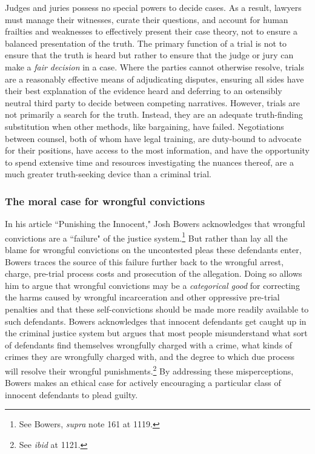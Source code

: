 Judges and juries possess no special powers to decide cases. As a result, lawyers must manage their witnesses, curate their questions, and account for human frailties and weaknesses to effectively present their case theory, not to ensure a balanced presentation of the truth. The primary function of a trial is not to ensure that the truth is heard but rather to ensure that the judge or jury can make a \textit{fair decision} in a case. Where the parties cannot otherwise resolve, trials are a reasonably effective means of adjudicating disputes, ensuring all sides have their best explanation of the evidence heard and deferring to an ostensibly neutral third party to decide between competing narratives. However, trials are not primarily a search for the truth. Instead, they are an adequate truth-finding substitution when other methods, like bargaining, have failed. Negotiations between counsel, both of whom have legal training, are duty-bound to advocate for their positions, have access to the most information, and have the opportunity to spend extensive time and resources investigating the nuances thereof, are a much greater truth-seeking device than a criminal trial.

\subsubsection{The moral case for wrongful convictions}

In his article ``Punishing the Innocent," Josh Bowers acknowledges that wrongful convictions are a ``failure" of the justice system.\footnote{See Bowers, \textit{supra} note 161 at 1119.} But rather than lay all the blame for wrongful convictions on the uncontested pleas these defendants enter, Bowers traces the source of this failure further back to the wrongful arrest, charge, pre-trial process costs and prosecution of the allegation. Doing so allows him to argue that wrongful convictions may be a \textit{categorical good} for correcting the harms caused by wrongful incarceration and other oppressive pre-trial penalties and that these self-convictions should be made more readily available to such defendants. Bowers acknowledges that innocent defendants get caught up in the criminal justice system but argues that most people misunderstand what sort of defendants find themselves wrongfully charged with a crime, what kinds of crimes they are wrongfully charged with, and the degree to which due process will resolve their wrongful punishments.\footnote{See \textit{ibid} at 1121.} By addressing these misperceptions, Bowers makes an ethical case for actively encouraging a particular class of innocent defendants to plead guilty.

